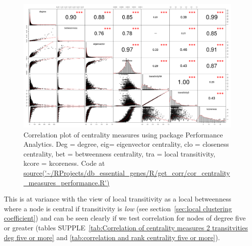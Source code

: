 \begin{figure}
    \centering
    \includegraphics[width=\textwidth]{images/chapter3/cor_pairs/analytics/Rplot_analytics_spearman_cor.png}
    \caption{Correlation plot of centrality measures using package Performance Analytics. Deg = degree, eig= eigenvector centrality, clo = closeness centrality, bet = betweenness centrality, tra = local transitivity, kcore = kcoreness. Code at \url{source('~/RProjects/db_essential_genes/R/get_corr/cor_centrality_measures_performance.R')}}
    \label{fig:Correlation plot centrality performance analytics}
\end{figure}







  This is at variance with the view of local transitivity as a local betweenness where a node is central if transitivity is \textit{low} (see section~\ref{sec:local clustering coefficient}) and can be seen clearly if we test correlation for nodes of degree five or greater (tables SUPPLE~\ref{tab:Correlation of centrality measures 2 transitvities deg five or more} and \ref{tab:correlation and rank centrality five or more}).



